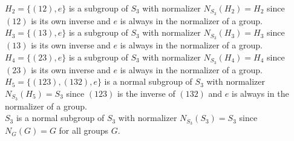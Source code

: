 \documentclass{scrartcl}
\begin{document}
$H_2=\{(12),e\}$ is a subgroup of $S_3$ with normalizer $N_{S_3}(H_2)=H_2$ since $(12)$ is its own inverse and $e$ is always in the normalizer of a group.\\

$H_3=\{(13),e\}$ is a subgroup of $S_3$ with normalizer $N_{S_3}(H_3)=H_3$ since $(13)$ is its own inverse and $e$ is always in the normalizer of a group.\\

$H_4=\{(23),e\}$ is a subgroup of $S_3$ with normalizer $N_{S_3}(H_4)=H_4$ since $(23)$ is its own inverse and $e$ is always in the normalizer of a group.\\

$H_5=\{(123),(132),e\}$ is a normal subgroup of $S_3$ with normalizer $N_{S_3}(H_5)=S_3$ since $(123)$ is the inverse of $(132)$ and $e$ is always in the normalizer of a group.\\

$S_3$ is a normal subgroup of $S_3$ with normalizer $N_{S_3}(S_3)=S_3$ since $N_G(G)=G$ for all groups $G$.\\
\end{document}
